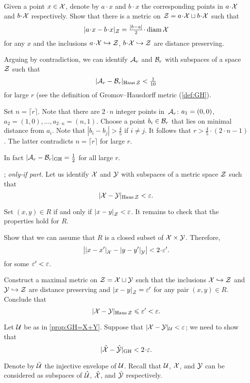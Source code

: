 Given a point $x\in\mathcal{X}$, denote by $a\cdot x$ and $b\cdot x$ the corresponding points in $a\cdot\spc{X}$ and $b\cdot \spc{X}$ respectively.
Show that there is a metric on $\spc{Z}\z=a\cdot\spc{X}\sqcup b\cdot\spc{X}$ such that 
\[|a\cdot x-b\cdot x|_{\spc{Z}}=\tfrac{|b-a|}2\cdot\diam\spc{X}\]
for any $x$ and the inclusions
$a\cdot\spc{X}\hookrightarrow\spc{Z}$,
$b\cdot\spc{X}\hookrightarrow\spc{Z}$ are distance preserving.

Arguing by contradiction,
we can identify $\mathcal{A}_r$ and $\mathcal{B}_r$ with subspaces of a space $\mathcal{Z}$
such that 
\[|\mathcal{A}_r-\mathcal{B}_r|_{\operatorname{\rm Haus}\nolimits \mathcal{Z}}<\tfrac1{10}\]
for large $r$ (see the definition of Gromov--Hausdorff metric (\ref{def:GH}).

Set $n=\lceil r \rceil$.
Note that there are $2\cdot n$ integer points in~$\mathcal{A}_r$: 
$a_1\z=(0,0)$, $a_2=(1,0),\dots,a_{2\cdot n}=(n,1)$.
Choose a point $b_i\in \mathcal{B}_r$ that lies on minimal distance from $a_i$.
Note that $|b_i-b_j|>\tfrac 45$ if $i\ne j$.
It follows that $r>\tfrac 45\cdot (2\cdot n-1)$.
The latter contradicts $n=\lceil r \rceil$ for large $r$.

In fact $|\mathcal{A}_r-\mathcal{B}_r|_{\operatorname{\rm GH}\nolimits}=\tfrac12$ for all large $r$.

\parbf{\ref{ex:H-R}}; \textit{only-if part.}
Let us identify $\mathcal{X}$ and $\mathcal{Y}$ with subspaces of a metric space $\mathcal{Z}$ such that 
\[|\mathcal{X}-\mathcal{Y}|_{\operatorname{\rm Haus}\nolimits \mathcal{Z}}<\varepsilon.\]

Set $(x,y)\in R$ if and only if $\dist{x}{y}{\spc{Z}}<\eps$.
It remains to check that the properties hold for $R$.

Show that we can assume that $R$ is a closed subset of $\mathcal{X}\times\mathcal{Y}$.
Therefore,
\[\bigl|\dist{x}{x'}{\spc{X}}-\dist{y}{y'}{\spc{Y}}\bigr|<2\cdot\eps'.\]
for some $\varepsilon'<\varepsilon$.

Construct a maximal metric on $\mathcal{Z}=\mathcal{X}\sqcup\mathcal{Y}$ such that the inclusions $\mathcal{X}\hookrightarrow\mathcal{Z}$ and
$\mathcal{Y}\hookrightarrow\mathcal{Z}$ are distance preserving and $\dist{x}{y}{\spc{Z}}=\eps'$ for any pair $(x,y)\in R$.
Conclude that 
\[|\mathcal{X}-\mathcal{Y}|_{\operatorname{\rm Haus}\nolimits \mathcal{Z}}\leqslant\varepsilon'<\varepsilon.\]


Let $\mathcal{U}$ be as in \ref{prop:GH=X+Y}.
Suppose that $|\mathcal{X}-\mathcal{Y}|_{\mathcal{U}}<\varepsilon$;
we need to show that 
\[|\hat{\spc{X}}-\hat{\spc{Y}}|_{\GH}<2\cdot \eps.\]

Denote by $\hat{\mathcal{U}}$ the injective envelope of $\mathcal{U}$.
Recall that $\mathcal{U}$, $\mathcal{X}$, and $\mathcal{Y}$ can be considered as subspaces of $\hat{\mathcal{U}}$, $\hat{\mathcal{X}}$, and $\hat{\mathcal{Y}}$ respectively.

